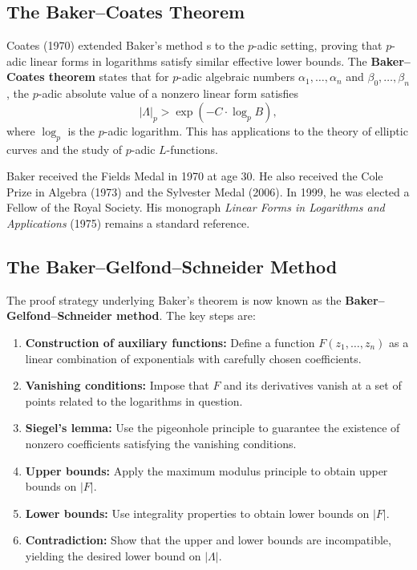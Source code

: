 \subsection*{The Baker--Coates Theorem}

Coates (1970) extended Baker's method \cite{baker1966}s to the $p$-adic setting, proving that $p$-adic linear forms in logarithms satisfy similar effective lower bounds. The \textbf{Baker--Coates theorem} states that for $p$-adic algebraic numbers $\alpha_1, \ldots, \alpha_n$ and $\beta_0, \ldots, \beta_n$, the $p$-adic absolute value of a nonzero linear form satisfies
\[
|\Lambda|_p > \exp(-C \cdot \log_p B),
\]
where $\log_p$ is the $p$-adic logarithm. This has applications to the theory of elliptic curves and the study of $p$-adic $L$-functions.

Baker received the Fields Medal in 1970 at age 30. He also received the Cole Prize in Algebra (1973) and the Sylvester Medal (2006). In 1999, he was elected a Fellow of the Royal Society. His monograph \emph{Linear Forms in Logarithms and Applications} (1975) remains a standard reference.

\subsection*{The Baker--Gelfond--Schneider Method}

The proof strategy underlying Baker's theorem is now known as the \textbf{Baker--Gelfond--Schneider method}. The key steps are:

\begin{enumerate}
    \item \textbf{Construction of auxiliary functions:} Define a function $F(z_1, \ldots, z_n)$ as a linear combination of exponentials with carefully chosen coefficients.
    \item \textbf{Vanishing conditions:} Impose that $F$ and its derivatives vanish at a set of points related to the logarithms in question.
    \item \textbf{Siegel's lemma:} Use the pigeonhole principle to guarantee the existence of nonzero coefficients satisfying the vanishing conditions.
    \item \textbf{Upper bounds:} Apply the maximum modulus principle to obtain upper bounds on $|F|$.
    \item \textbf{Lower bounds:} Use integrality properties to obtain lower bounds on $|F|$.
    \item \textbf{Contradiction:} Show that the upper and lower bounds are incompatible, yielding the desired lower bound on $|\Lambda|$.
\end{enumerate}

